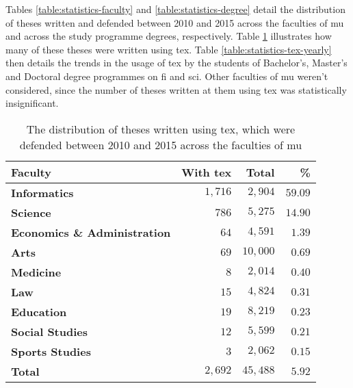   Tables \ref{table:statistics-faculty} and \ref{table:statistics-degree} detail the distribution of theses written and defended between 2010 and 2015 across the faculties of \gls{mu} and across the study programme degrees, respectively. Table \ref{table:statistics-tex} illustrates how many of these theses were written using \gls{tex}. Table \ref{table:statistics-tex-yearly} then details the trends in the usage of \gls{tex} by the students of Bachelor's, Master's and Doctoral degree programmes on \gls{fi} and \gls{sci}. Other faculties of \gls{mu} weren't considered, since the number of theses written at them using \gls{tex} was statistically insignificant.

  \begin{table}
    \begin{tabularx}{\textwidth}{Xrrr}
      \textbf{Faculty} & \textbf{With \gls{tex}} & \textbf{Total} & \textbf{\%} \\
      \hline
      \textbf{Informatics}                 & $1{,}716$ & $2{,}904$  & $59.09$ \\%
      \textbf{Science}                     & $786$     & $5{,}275$  & $14.90$ \\%
      \textbf{Economics \& Administration} & $64$      & $4{,}591$  & $1.39$  \\%
      \textbf{Arts}                        & $69$      & $10{,}000$ & $0.69$  \\%
      \textbf{Medicine}                    & $8$       & $2{,}014$  & $0.40$  \\%
      \textbf{Law}                         & $15$      & $4{,}824$  & $0.31$  \\%
      \textbf{Education}                   & $19$      & $8{,}219$  & $0.23$  \\%
      \textbf{Social Studies}              & $12$      & $5{,}599$  & $0.21$  \\%
      \textbf{Sports Studies}              & $3$       & $2{,}062$  & $0.15$  \\%
      \hline
      \textbf{Total} & \textbf{$2{,}692$} & \textbf{$45{,}488$} & \textbf{$5.92$}
    \end{tabularx}
    \caption{The distribution of theses written using \gls{tex}, which were defended between 2010 and 2015 across the faculties of \gls{mu}}
    \label{table:statistics-tex}
  \end{table}
  

